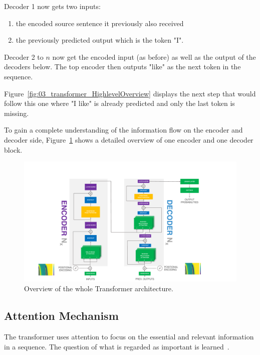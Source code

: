 Decoder 1 now gets two inputs: 

\begin{enumerate}
    \item the encoded source sentence it previously also received
    \item the previously predicted output which is the token "I".
\end{enumerate}

Decoder 2 to $n$ now get the encoded input {(as before)} as well as the output of the decoders below. The top encoder then outputs "like" as the next token in the sequence. 

Figure~\ref{fig:03_transformer_HighlevelOverview} displays the next step that would follow this one where "I like" is already predicted and only the last token is missing.
\bigskip

To gain a complete understanding of the information flow on the encoder and decoder side, Figure~\ref{fig:03_transformer_overview} shows a detailed overview of one encoder and one decoder block.

\begin{figure}[t]
    \centering
    \includegraphics[width=\textwidth]{figures/03_theory/03_transformerArchitectureOverview}
    \caption{Overview of the whole Transformer architecture.}
    \label{fig:03_transformer_overview}
\end{figure}

\subsection{Attention Mechanism}

The transformer uses attention to focus on the essential and relevant information in a sequence. The question of what is regarded as important is learned~\cite{Vaswani2017d}.

